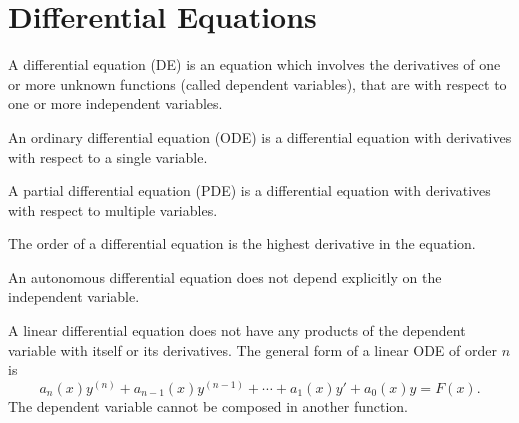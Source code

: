 \documentclass{article}
\begin{document}
\section{Differential Equations}
\begin{definition}
    A differential equation (DE) is an equation which involves the
    derivatives of one or more unknown functions (called dependent
    variables), that are with respect to one or more independent
    variables.
\end{definition}
\begin{definition}
    An ordinary differential equation (ODE) is a differential equation
    with derivatives with respect to a single variable.
\end{definition}
\begin{definition}
    A partial differential equation (PDE) is a differential equation
    with derivatives with respect to multiple variables.
\end{definition}
\begin{definition}
    The order of a differential equation is the highest derivative in
    the equation.
\end{definition}
\begin{definition}
    An autonomous differential equation does not depend explicitly on
    the independent variable.
\end{definition}
\begin{definition}
    A linear differential equation does not have any products of the
    dependent variable with itself or its derivatives. The general form
    of a linear ODE of order \(n\) is
    \begin{equation*}
        a_n\left( x \right)y^{\left( n \right)} + a_{n-1}\left( x \right)y^{\left( n-1 \right)} + \cdots + a_1\left( x \right)y' + a_0\left( x \right)y = F\left( x \right).
    \end{equation*}
    The dependent variable cannot be composed in another function.
\end{definition}
\end{document}
